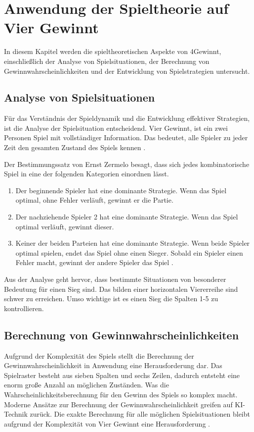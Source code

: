 \chapter{Anwendung der Spieltheorie auf Vier Gewinnt}
\label{cha:Anwendung der Spieltheorie auf Vier Gewinnt}
In diesem Kapitel werden die spieltheoretischen Aspekte von 4Gewinnt, einschließlich der Analyse von Spielsituationen, der Berechnung von Gewinnwahrscheinlichkeiten und der Entwicklung von Spielstrategien untersucht.


\section{Analyse von Spielsituationen}
\label{sec:Analyse von Spielsituationen}
Für das Verständnis der Spieldynamik und die Entwicklung effektiver Strategien, ist die Analyse der Spielsituation entscheidend.
Vier Gewinnt, ist ein zwei Personen Spiel mit vollständiger Information. Das bedeutet, alle Spieler zu jeder Zeit den gesamten Zustand des Spiels kennen \autocite{ruile2009viergewinnt}.

Der Bestimmungssatz von Ernst Zermelo besagt, dass sich jedes kombinatorische Spiel in eine der folgenden Kategorien einordnen lässt.
\begin{enumerate}
	\item  Der beginnende Spieler hat eine dominante Strategie. Wenn das Spiel optimal, ohne Fehler verläuft, gewinnt er die Partie.
	\item Der nachziehende Spieler 2 hat eine dominante Strategie. Wenn das Spiel optimal verläuft, gewinnt dieser.
	\item Keiner der beiden Parteien hat eine dominante Strategie. Wenn beide Spieler optimal spielen, endet das Spiel ohne einen Sieger. Sobald ein Spieler einen Fehler macht, gewinnt der andere Spieler das Spiel \autocite{mueller_2011}.
\end{enumerate}

Aus der Analyse geht hervor, dass bestimmte Situationen von besonderer Bedeutung für einen Sieg sind.
Das bilden einer horizontalen Viererreihe sind schwer zu erreichen. Umso wichtige ist es einen Sieg die Spalten 1-5 zu kontrollieren. 


\section{Berechnung von Gewinnwahrscheinlichkeiten}
Aufgrund der Komplexität des Spiels stellt die Berechnung der Gewinnwahrscheinlichkeit in Anwendung eine Herausforderung dar. Das Spielraster besteht aus sieben Spalten und sechs Zeilen, dadurch entsteht eine enorm große Anzahl an möglichen Zuständen. Was die Wahrscheinlichkeitsberechnung für den Gewinn des Spiels so komplex macht.
Moderne Ansätze zur Berechnung der Gewinnwahrscheinlichkeit greifen auf KI-Technik zurück. Die exakte Berechnung für alle möglichen Spielsituationen bleibt aufgrund der Komplexität von Vier Gewinnt eine Herausforderung \autocite{ruile2009viergewinnt}.
